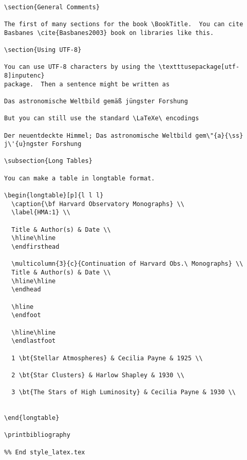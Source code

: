 \begin{verbatim}

\section{General Comments}

The first of many sections for the book \BookTitle.  You can cite 
Basbanes \cite{Basbanes2003} book on libraries like this.

\section{Using UTF-8}

You can use UTF-8 characters by using the \textttusepackage[utf-8]inputenc}
package.  Then a sentence might be written as

Das astronomische Weltbild gemäß jüngster Forshung

But you can still use the standard \LaTeXe\ encodings

Der neuentdeckte Himmel; Das astronomische Weltbild gem\"{a}{\ss} j\'{u}ngster Forshung

\subsection{Long Tables}

You can make a table in longtable format.

\begin{longtable}[p]{l l l}
  \caption{\bf Harvard Observatory Monographs} \\
  \label{HMA:1} \\

  Title & Author(s) & Date \\
  \hline\hline
  \endfirsthead

  \multicolumn{3}{c}{Continuation of Harvard Obs.\ Monographs} \\
  Title & Author(s) & Date \\
  \hline\hline
  \endhead

  \hline
  \endfoot
  
  \hline\hline
  \endlastfoot

  1 \bt{Stellar Atmospheres} & Cecilia Payne & 1925 \\

  2 \bt{Star Clusters} & Harlow Shapley & 1930 \\

  3 \bt{The Stars of High Luminosity} & Cecilia Payne & 1930 \\

  
\end{longtable}

\printbibliography

%% End style_latex.tex
\end{verbatim}

